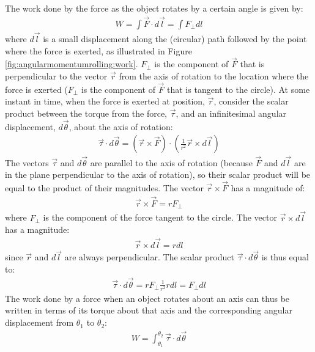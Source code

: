 The work done by the force as the object rotates by a certain angle is given by:
\begin{align*}
W = \int \vec F \cdot d\vec l = \int F_\perp dl
\end{align*}
where $d\vec l$ is a small displacement along the (circular) path followed by the point where the force is exerted, as illustrated in Figure \ref{fig:angularmomentumrolling:work}. $F_\perp$ is the component of $\vec F$ that is perpendicular to the vector $\vec r$ from the axis of rotation to the location where the force is exerted ($F_\perp$ is the component of $\vec F$ that is tangent to the circle).
At some instant in time, when the force is exerted at position, $\vec r$, consider the scalar product between the torque from the force, $\vec \tau$, and an infinitesimal angular displacement, $d\vec \theta$, about the axis of rotation:
\begin{align*}
\vec\tau \cdot d\vec\theta = (\vec r \times \vec F) \cdot \left(\frac{1}{r^2} \vec r\times d\vec l\right)
\end{align*}
The vectors $\vec \tau$ and $d\vec \theta$ are parallel to the axis of rotation (because $\vec F$ and $d\vec l$ are in the plane perpendicular to the axis of rotation), so their scalar product will be equal to the product of their magnitudes. The vector $\vec r \times \vec F$ has a magnitude of:
\begin{align*}
\vec r \times \vec F = rF_\perp
\end{align*} 
where $F_\perp$ is the component of the force tangent to the circle. The vector $\vec r\times d\vec l$ has a magnitude:
\begin{align*}
\vec r\times d\vec l = rdl
\end{align*}
since $\vec r$ and $d\vec l$ are always perpendicular. The scalar product $\vec\tau \cdot d\vec\theta$ is thus equal to:
\begin{align*}
\vec\tau \cdot d\vec\theta = rF_\perp \frac{1}{r^2} rdl = F_\perp dl
\end{align*}
The work done by a force when an object rotates about an axis can thus be written in terms of its torque about that axis and the corresponding angular displacement from $\theta_1$ to $\theta_2$:
\begin{align}
W = \int_{\theta_1}^{\theta_2}\vec\tau\cdot d\vec \theta
\end{align}


